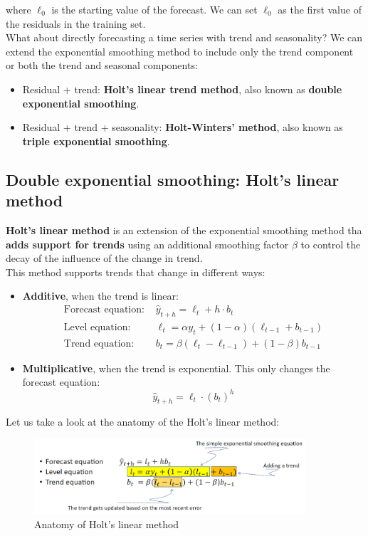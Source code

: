 where $\ell_0$ is the starting value of the forecast. We can set $\ell_0$ as the
first value of the residuals in the training set.\\

What about directly forecasting a time series with trend and seasonality? We can
extend the exponential smoothing method to include only the trend component 
or both the trend and seasonal components:
\begin{itemize}
    \item Residual + trend: \textbf{Holt's linear trend method}, also known as
    \textbf{double exponential smoothing}.
    \item Residual + trend + seasonality: \textbf{Holt-Winters' method}, also known
    as \textbf{triple exponential smoothing}.
\end{itemize}

\subsection{Double exponential smoothing: Holt's linear method}

\textbf{Holt's linear method} is an extension of the exponential smoothing method
tha \textbf{adds support for trends} using an additional smoothing factor $\beta$
to control the decay of the influence of the change in trend.\\

This method supports trends that change in different ways:
\begin{itemize}
    \item \textbf{Additive}, when the trend is linear:
    \begin{align*}
        \text{Forecast equation: } &\hat{y}_{t+h} = \ell_t + h \cdot b_t\\
        \text{Level equation: } &\ell_t = \alpha y_t + (1 - \alpha)(\ell_{t-1} + b_{t-1})\\
        \text{Trend equation: } &b_t = \beta(\ell_t - \ell_{t-1}) + (1 - \beta)b_{t-1}
    \end{align*}

    \item \textbf{Multiplicative}, when the trend is exponential. This only changes
    the forecast equation:
    $$\hat{y}_{t+h} = \ell_t \cdot (b_t)^h$$
\end{itemize}

Let us take a look at the anatomy of the Holt's linear method:

\begin{figure}[H]
    \centering
    \includegraphics[width=0.9\textwidth]{figures/holt_linear.png}
    \caption{Anatomy of Holt's linear method}
    \label{fig:holt_linear}
\end{figure}

